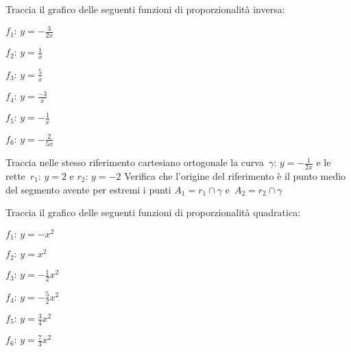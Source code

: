 \begin{esercizio}
\label{ese:D.51}
Traccia il grafico delle seguenti funzioni di proporzionalità inversa:
\begin{multicols}{3}
 \begin{enumeratea}
\item $f_{1}:\, y=-{\frac{3}{2x}}$
\item $f_{2}:\, y=\frac{1}{x}$
\item $f_{3}:\, y=\frac{5}{x}$
\item $f_{4}:\, y=\frac{-3}{x}$
\item $f_{5}:\, y=-{\frac{1}{x}}$
\item $f_{6}:\, y=-\frac{2}{5x}$
\end{enumeratea}
\end{multicols}
\end{esercizio}

\begin{esercizio}
\label{ese:D.52}
Traccia nelle stesso riferimento cartesiano ortogonale la curva~$\gamma:\, 
y=-{\frac{1}{2x}}$ e le rette~$r_{1}:\, y=2$ e
$r_{2}:\, y=-2$ Verifica che l'origine del riferimento è il punto medio del 
segmento avente per estremi i punti
$A_{1}=r_{1}\cap \gamma$ e~$A_{2}=r_{2}\cap \gamma$
\end{esercizio}

\begin{esercizio}
\label{ese:D.53}
Traccia il grafico delle seguenti funzioni di proporzionalità quadratica:
\begin{multicols}{3}
 \begin{enumeratea}
\item $f_{1}:\, y=-x^{2}$
\item $f_{2}:\, y=x^{2}$
\item $f_{3}:\, y=-{\frac{1}{2}}x^{2}$
\item $f_{4}:\, y=-{\frac{5}{2}}x^{2}$
\item $f_{5}:\, y=\frac{3}{4}x^{2}$
\item $f_{6}:\, y=\frac{7}{3}x^{2}$
\end{enumeratea}
\end{multicols}
\end{esercizio}

